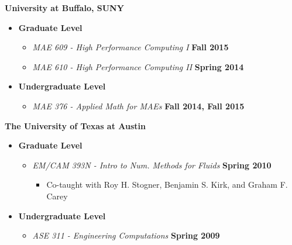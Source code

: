\textbf{University at Buffalo, SUNY}
\begin{itemize}
\item[] \textbf{Graduate Level}
  \begin{itemize}
  \item[] \textit{MAE 609 - High Performance Computing I} \hfill \textbf{Fall 2015}
  \item[] \textit{MAE 610 - High Performance Computing II} \hfill \textbf{Spring 2014}
  \end{itemize}
\item[] \textbf{Undergraduate Level}
  \begin{itemize}
  \item[] \textit{MAE 376 - Applied Math for MAEs} \hfill \textbf{Fall 2014, Fall 2015}
  \end{itemize}
\end{itemize}

\textbf{The University of Texas at Austin}
\begin{itemize}
\item[] \textbf{Graduate Level}
  \begin{itemize}
  \item[] \textit{EM/CAM 393N - Intro to Num. Methods for Fluids}%
    \hfill \textbf{Spring 2010}
    \begin{itemize}
    \item Co-taught with Roy H. Stogner, Benjamin S. Kirk, and Graham F. Carey
    \end{itemize}
  \end{itemize}
\item[] \textbf{Undergraduate Level}
  \begin{itemize}
  \item[] \textit{ASE 311 - Engineering Computations}%
    \hfill \textbf{Spring 2009}
  \end{itemize}
\end{itemize}
